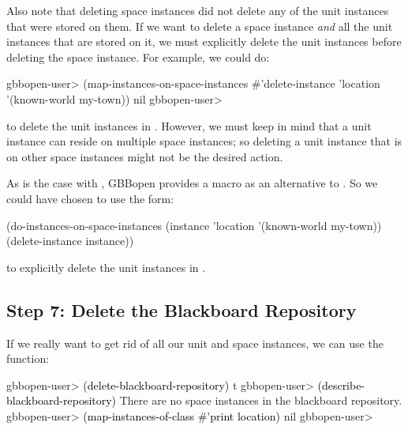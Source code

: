 \documentclass[10pt,twoside,english,pdftex]{article}
\begin{document}
%
%
%
Also note that deleting space instances did not delete any of the unit
instances that were stored on them.  If we want to delete a space instance
\textit{and\/} all the unit instances that are stored on it, we must
explicitly delete the unit instances before deleting the space instance.
For example, we could do:
%
\W\supp
\begin{example}
\textcolor{darkergray}{%
  gbbopen-user> (map-instances-on-space-instances #'delete-instance 
                  'location '(known-world my-town))
  nil
  gbbopen-user>}
\end{example}
%
to delete the unit instances in .  However, we must keep
in mind that a unit instance can reside on multiple space instances; so
deleting a unit instance that is on other space instances might not be the
desired action.

%
%
As is the case with , GBBopen provides a
 macro as an alternative to
.  So we could have chosen to
use the form:
%
\W\supp
\begin{example}
\textcolor{darkergray}{%
  (do-instances-on-space-instances (instance 'location '(known-world my-town))
    (delete-instance instance))}
\end{example}
%
to explicitly delete the  unit instances in
.

\subsection*{Step 7: Delete the Blackboard Repository}

%
%
%
If we really want to get rid of all our unit and space instances, we can use
the  function:
%
\W\supp
\begin{example}
\textcolor{darkergray}{%
  gbbopen-user> \textcolor{black}{(delete-blackboard-repository)}
  t
  gbbopen-user> \textcolor{black}{(describe-blackboard-repository)}
  There are no space instances in the blackboard repository.
  gbbopen-user> \textcolor{black}{(map-instances-of-class #'print location)}
  nil
  gbbopen-user>}
\end{example}
\end{document}

